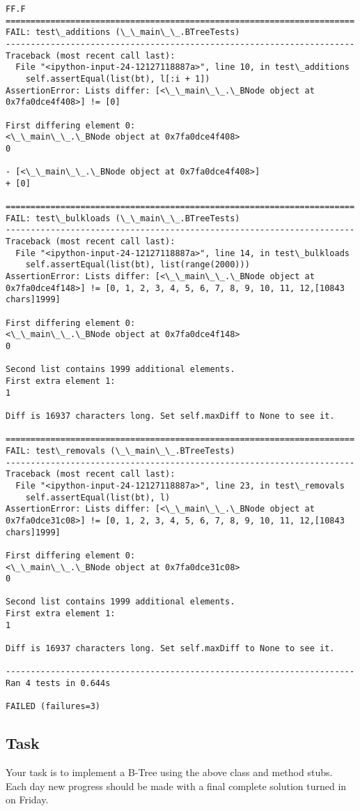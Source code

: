\documentclass[11pt]{article}
\begin{document}
    \begin{Verbatim}[commandchars=\\\{\}]
FF.F
======================================================================
FAIL: test\_additions (\_\_main\_\_.BTreeTests)
----------------------------------------------------------------------
Traceback (most recent call last):
  File "<ipython-input-24-12127118887a>", line 10, in test\_additions
    self.assertEqual(list(bt), l[:i + 1])
AssertionError: Lists differ: [<\_\_main\_\_.\_BNode object at 0x7fa0dce4f408>] != [0]

First differing element 0:
<\_\_main\_\_.\_BNode object at 0x7fa0dce4f408>
0

- [<\_\_main\_\_.\_BNode object at 0x7fa0dce4f408>]
+ [0]

======================================================================
FAIL: test\_bulkloads (\_\_main\_\_.BTreeTests)
----------------------------------------------------------------------
Traceback (most recent call last):
  File "<ipython-input-24-12127118887a>", line 14, in test\_bulkloads
    self.assertEqual(list(bt), list(range(2000)))
AssertionError: Lists differ: [<\_\_main\_\_.\_BNode object at 0x7fa0dce4f148>] != [0, 1, 2, 3, 4, 5, 6, 7, 8, 9, 10, 11, 12,[10843 chars]1999]

First differing element 0:
<\_\_main\_\_.\_BNode object at 0x7fa0dce4f148>
0

Second list contains 1999 additional elements.
First extra element 1:
1

Diff is 16937 characters long. Set self.maxDiff to None to see it.

======================================================================
FAIL: test\_removals (\_\_main\_\_.BTreeTests)
----------------------------------------------------------------------
Traceback (most recent call last):
  File "<ipython-input-24-12127118887a>", line 23, in test\_removals
    self.assertEqual(list(bt), l)
AssertionError: Lists differ: [<\_\_main\_\_.\_BNode object at 0x7fa0dce31c08>] != [0, 1, 2, 3, 4, 5, 6, 7, 8, 9, 10, 11, 12,[10843 chars]1999]

First differing element 0:
<\_\_main\_\_.\_BNode object at 0x7fa0dce31c08>
0

Second list contains 1999 additional elements.
First extra element 1:
1

Diff is 16937 characters long. Set self.maxDiff to None to see it.

----------------------------------------------------------------------
Ran 4 tests in 0.644s

FAILED (failures=3)

    \end{Verbatim}

    \subsection{Task}\label{task}

Your task is to implement a B-Tree using the above class and method
stubs. Each day new progress should be made with a final complete
solution turned in on Friday.


    
    
    
    
\end{document}
